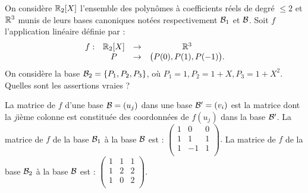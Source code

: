 \begin{question}
On considère $\mathbb{R}_2[X]$ l'ensemble des polynômes à coefficients réels de degré $\le 2$ et  $\mathbb{R}^3$ munis de leurs bases canoniques notées respectivement ${\cal {B}}_1$ et ${\cal {B}}$. Soit $f$ l'application linéaire définie par  : 
$$\begin{array}{rccc}f:&\mathbb{R}_2[X] &\to& \mathbb{R}^3\\
& P&\to &\big(P(0),P(1),P(-1)\big).  \end{array}$$
On considère la base ${\cal {B}}_2 = \{P_1,P_2,P_3\}$, où $ P_1=1, P_2=1+X, P_3=1+X^2$. Quelles sont les assertions vraies ?
\begin{answers} 
\end{answers}
\vskip2mm
\begin{explanations} La matrice de $f$  d'une base $ {\cal {B}}=(u_j)$ dans une  base $ {\cal {B}}'=(v_i)$ est la matrice  dont la $j$ième colonne est constituée des coordonnées de  $f(u_j)$ dans la base $ {\cal {B}}'$. La matrice de $f$ de la base $ {\cal {B}}_1$ à la base  ${\cal {B}}$  est : $
\left(\begin{array}{rcc}
1&0&0\\
1&1&1\\ 
1&-1&1\\
\end{array}\right).$
\vskip0mm
La matrice de $f$ de la base $ {\cal {B}}_2$ à la base  ${\cal {B}}$  est : $
 \left(\begin{array}{rcc}
1&1&1\\
1&2&2\\ 
1&0&2\\
\end{array}\right).$
\end{explanations}
\end{question}
